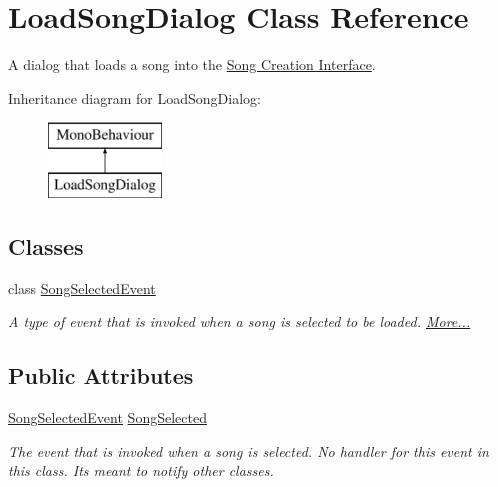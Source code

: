 \hypertarget{class_load_song_dialog}{}\section{Load\+Song\+Dialog Class Reference}
\label{class_load_song_dialog}


A dialog that loads a song into the \hyperlink{group___doc_s_c}{Song Creation Interface}.  


Inheritance diagram for Load\+Song\+Dialog\+:\begin{figure}[H]
\begin{center}
\leavevmode
\includegraphics[height=2.000000cm]{class_load_song_dialog}
\end{center}
\end{figure}
\subsection*{Classes}
\begin{DoxyCompactItemize}
\item 
class \hyperlink{group___s_c___l_s_d_event_types_class_load_song_dialog_1_1_song_selected_event}{Song\+Selected\+Event}
\begin{DoxyCompactList}\small\item\em A type of event that is invoked when a song is selected to be loaded.  \hyperlink{group___s_c___l_s_d_event_types_class_load_song_dialog_1_1_song_selected_event}{More...}\end{DoxyCompactList}\end{DoxyCompactItemize}
\subsection*{Public Attributes}
\begin{DoxyCompactItemize}
\item 
\hyperlink{group___s_c___l_s_d_event_types_class_load_song_dialog_1_1_song_selected_event}{Song\+Selected\+Event} \hyperlink{group___s_c___l_s_d_event_ga20438ab6e4feb9616a99faee6504e86c}{Song\+Selected}
\begin{DoxyCompactList}\small\item\em The event that is invoked when a song is selected. No handler for this event in this class. It\textquotesingle{}s meant to notify other classes. \end{DoxyCompactList}\end{DoxyCompactItemize}
